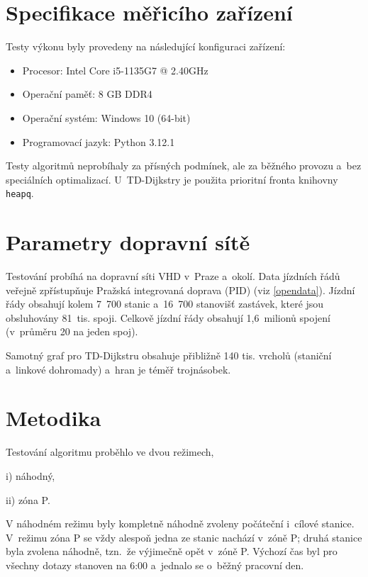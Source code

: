 \section{Specifikace měřicího zařízení}
Testy výkonu byly provedeny na následující konfiguraci zařízení:

\begin{itemize}
	\item Procesor: Intel Core i5-1135G7 @ 2.40GHz
	\item Operační paměť: 8 GB DDR4
	\item Operační systém: Windows 10 (64-bit)
	\item Programovací jazyk: Python 3.12.1
\end{itemize}

Testy algoritmů neprobíhaly za přísných podmínek, ale za běžného provozu a~bez speciálních optimalizací. U~TD-Dijkstry je použita prioritní fronta knihovny \texttt{heapq}. 

\section{Parametry dopravní sítě}
\renewcommand{\sectionautorefname}{oddíl}
Testování probíhá na dopravní síti VHD v~Praze a~okolí. Data jízdních řádů veřejně zpřístupňuje Pražská integrovaná doprava (PID) (viz \autoref{opendata}). Jízdní řády obsahují kolem 7~700 stanic a~16~700 stanovišť zastávek, které jsou obsluhovány 81~tis. spoji. Celkově jízdní řády obsahují 1,6~milionů spojení (v~průměru 20 na jeden spoj).
\renewcommand{\sectionautorefname}{oddíle}

Samotný graf pro TD-Dijkstru obsahuje přibližně 140 tis. vrcholů (staniční a~linkové dohromady) a~hran je téměř trojnásobek.

\section{Metodika}
Testování algoritmu proběhlo ve dvou režimech, \begin{enumerate*}
	\item[i)] náhodný,
	\item[ii)] zóna P.
\end{enumerate*} 

V náhodném režimu byly kompletně náhodně zvoleny počáteční i~cílové stanice. V~režimu zóna P se vždy alespoň jedna ze stanic nachází v~zóně P; druhá stanice byla zvolena náhodně, tzn.~že výjimečně opět v~zóně P. Výchozí čas byl pro všechny dotazy stanoven na 6:00 a~jednalo se o~běžný pracovní den. 

